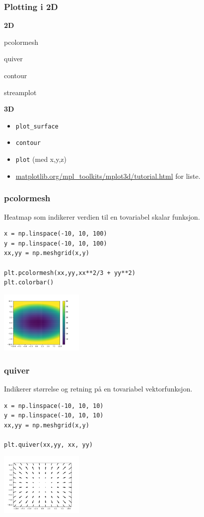 \documentclass{beamer}
\begin{document}
\begin{frame}[fragile]
  \frametitle{Plotting i 2D}
  \begin{minipage}[t]{.45\linewidth}
    \centering
    \textbf{2D}
  \begin{itemize}
  \item pcolormesh
  \item quiver
    {\color{gray}
    \item contour
    \item streamplot
      }
  \end{itemize}
  \end{minipage}
  \begin{minipage}[t]{.45\linewidth}
    \centering
    \textbf{3D}
    \begin{itemize}
      \color{gray}
    \item \lstinline{plot_surface}
    \item \lstinline{contour}
    \item \lstinline{plot} (med x,y,z)
    \item \url{matplotlib.org/mpl_toolkits/mplot3d/tutorial.html} for liste.
    \end{itemize}
  \end{minipage}
\end{frame}

\begin{frame}[fragile]
  \frametitle{pcolormesh}
  Heatmap som indikerer verdien til en tovariabel skalar funksjon.
  \begin{lstlisting}
x = np.linspace(-10, 10, 100)
y = np.linspace(-10, 10, 100)
xx,yy = np.meshgrid(x,y)

plt.pcolormesh(xx,yy,xx**2/3 + yy**2)
plt.colorbar()
  \end{lstlisting}
    \includegraphics[width=0.3\textwidth]{colormap2}
\end{frame}
\begin{frame}[fragile]
  \frametitle{quiver}
  Indikerer størrelse og retning på en tovariabel vektorfunksjon.
  \begin{lstlisting}
x = np.linspace(-10, 10, 10)
y = np.linspace(-10, 10, 10)
xx,yy = np.meshgrid(x,y)

plt.quiver(xx,yy, xx, yy)
  \end{lstlisting}
      \includegraphics[width=0.3\textwidth]{quiver}
\end{frame}
\end{document}
